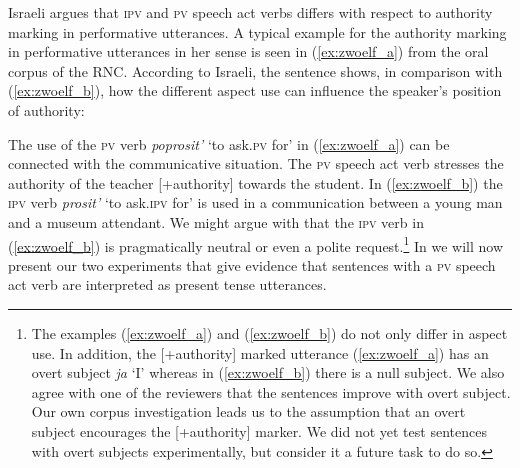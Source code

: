 \documentclass[output=paper,
colorlinks,
citecolor=brown,
newtxmath,
hidelinks
]{langscibook}
\begin{document}
Israeli argues that \textsc{ipv} and \textsc{pv} speech act verbs differs with respect to authority marking in performative utterances. A typical example for the authority marking in performative utterances in her sense is seen in (\ref{ex:zwoelf_a}) from the oral corpus of the RNC. According to Israeli, the sentence shows, in comparison with (\ref{ex:zwoelf_b}), how the different aspect use can influence the speaker’s position of authority:

\ea\label{ex:zwoelf} 
            \z
\z

\noindent The use of the \textsc{pv} verb \textit{poprosit’} ‘to ask\textsc{.pv} for’ in (\ref{ex:zwoelf_a}) can be connected with the communicative situation. The \textsc{pv} speech act verb stresses the authority of the teacher [+authority] towards the student. In (\ref{ex:zwoelf_b}) the \textsc{ipv} verb \textit{prosit’} ‘to ask\textsc{.ipv} for’ is used in a communication between a young man and a museum attendant. We might argue with \citeauthor{Israeli2001} that the \textsc{ipv} verb in (\ref{ex:zwoelf_b}) is pragmatically neutral or even a polite request.\footnote{The examples (\ref{ex:zwoelf_a}) and (\ref{ex:zwoelf_b}) do not only differ in aspect use. In addition, the [+authority] marked utterance (\ref{ex:zwoelf_a}) has an overt subject \textit{ja} ‘I’ whereas in (\ref{ex:zwoelf_b}) there is a null subject. We also agree with one of the reviewers that the sentences improve with overt subject. Our own corpus investigation leads us to the assumption that an overt subject encourages the [+authority] marker. We did not yet test sentences with overt subjects experimentally, but consider it a future task to do so.\label{fn5}} In  we will now present our two experiments that give evidence that sentences with a \textsc{pv} speech act verb are interpreted as present tense utterances. 
\end{document}
